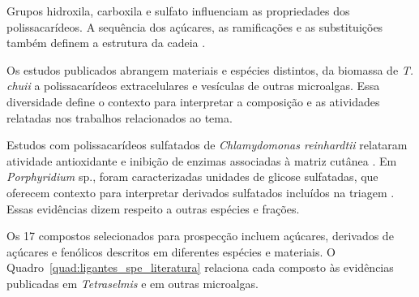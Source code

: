 Grupos hidroxila, carboxila e sulfato influenciam as propriedades dos polissacarídeos. A sequência dos açúcares, as ramificações e as substituições também definem a estrutura da cadeia \parencite{delattre2016,he2025}.

Os estudos publicados abrangem materiais e espécies distintos, da biomassa de \textit{T. chuii} a polissacarídeos extracelulares e vesículas de outras microalgas. Essa diversidade define o contexto para interpretar a composição e as atividades relatadas nos trabalhos relacionados ao tema.

Estudos com polissacarídeos sulfatados de \textit{Chlamydomonas reinhardtii} relataram atividade antioxidante e inibição de enzimas associadas à matriz cutânea \parencite{falcao2020}. Em \textit{Porphyridium} sp., foram caracterizadas unidades de glicose sulfatadas, que oferecem contexto para interpretar derivados sulfatados incluídos na triagem \parencite{geresh2009}. Essas evidências dizem respeito a outras espécies e frações.

Os 17 compostos selecionados para prospecção incluem açúcares, derivados de açúcares e fenólicos descritos em diferentes espécies e materiais. O Quadro~\ref{quad:ligantes_spe_literatura} relaciona cada composto às evidências publicadas em \textit{Tetraselmis} e em outras microalgas.

